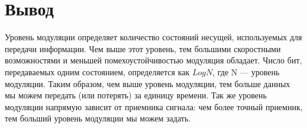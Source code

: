 \section{Вывод}
Уровень модуляции определяет количество состояний несущей, используемых для передачи информации. Чем выше этот уровень, тем большими скоростными возможностями и меньшей помехоустойчивостью модуляция обладает. Число бит, передаваемых одним состоянием, определяется как $Log N$, где N — уровень модуляции. Таким образом, чем выше уровень модуляции, тем больше данных мы можем передать (или потерять) за единицу времени. Так же уровень модуляции напрямую зависит от приемника сигнала: чем более точный приемник, тем больший уровень модуляции мы можем задать.